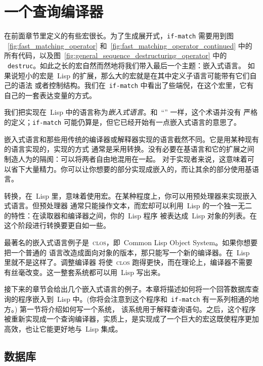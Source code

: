 
\chapter{一个查询编译器}
\label{chap:a_query_compiler}

在前面章节里定义的有些宏很长。为了生成展开式，\texttt{if-match} 需要用到图
~\ref{fig:fast_matching_operator} 和~\ref{fig:fast_matching_operator_continued}
中的所有代码，以及图~\ref{fig:general_sequence_destructuring_operator} 中的
~\texttt{destruc}。如此之长的宏自然而然地将我们带入最后一个主题：嵌入式语言。
如果说短小的宏是~Lisp 的扩展，那么大的宏就是在其中定义子语言\pozhehao{}可能带有它们自己的语法
或者控制结构。我们在~\texttt{if-match} 中看出了些端倪，在这个宏里，它有自己的一套表达变量的方式。

我们把实现在~Lisp 中的语言称为\emph{嵌入式语言}。和~``\utility'' 一样，这个术语并没有
严格的定义；\texttt{if-match} 可能仍算是\utility，但它已经开始有一点嵌入式语言的意思了。

嵌入式语言和那些用传统的编译器或解释器实现的语言截然不同。它是用某种现有的语言实现的，实现的方式
通常是采用转换。没有必要在基语言和它的扩展之间制造人为的隔阂：可以将两者自由地混用在一起。
对于实现者来说，这意味着可以省下大量精力。你可以让你想要的部分实现成嵌入的，而让其余的部分使用基语言。

转换，在~Lisp 里，意味着使用宏。在某种程度上，你可以用预处理器来实现嵌入式语言。但预处理器
通常只能操作文本，而宏却可以利用~Lisp 的一个独一无二的特性：在读取器和编译器之间，你的~Lisp 程序
被表达成~Lisp 对象的列表。在这个阶段进行转换要更自如一些。

最著名的嵌入式语言例子是~\textsc{clos}，即~Common Lisp Object System。如果你想要把一个普通的
语言改造成面向对象的版本，那只能写一个新的编译器。在~Lisp 里就不是这样了。调整编译器
将使~\textsc{clos} 跑得更快，而在理论上，编译器不需要有丝毫改变。这一整套系统都可以用~Lisp 写出来。

接下来的章节会给出几个嵌入式语言的例子。本章将描述如何将一个回答数据库查询的程序嵌入到~Lisp 中。(你将会注意到这个程序和~\texttt{if-match} 有一系列相通的地方。) 第一节将介绍如何写一个系统，
该系统用于解释查询语句。之后，这个程序被重新实现成一个查询编译器，实质上，是实现成了一个巨大的宏\pozhehao{}这既使程序更加高效，也让它能更好地与~Lisp 集成。

\section{数据库}
\label{sec:the_database}

